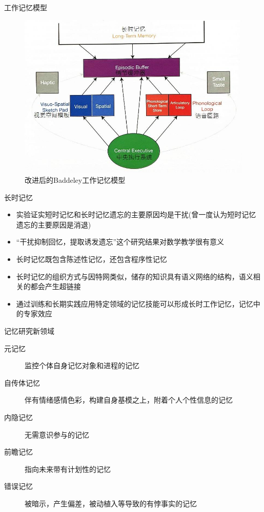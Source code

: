\documentclass[serif]{beamer}
\begin{document}
  \begin{frame}{工作记忆模型}
  \begin{figure}[t]
  	\centering
  	\includegraphics[scale=0.3]{model2.jpg}
  	\caption{改进后的Baddeley工作记忆模型}
  \end{figure}
  \end{frame}
  
  \begin{frame}{长时记忆}
       \begin{itemize}
       	 \item 实验证实短时记忆和长时记忆遗忘的主要原因均是干扰(曾一度认为短时记忆遗忘的主要原因是消退)
       	 \item “干扰抑制回忆，提取诱发遗忘”这个研究结果对数学教学很有意义
       	 \item 长时记忆既包含陈述性记忆，还包含程序性记忆
       	 \item 长时记忆的组织方式与因特网类似，储存的知识具有语义网络的结构，语义相关的都会产生超链接
       	 \item 通过训练和长期实践应用特定领域的记忆技能可以形成长时工作记忆，记忆中的专家效应
       \end{itemize}
  \end{frame}
  
  \begin{frame}{记忆研究新领域}
      \begin{description}
      	\item[元记忆] 监控个体自身记忆对象和进程的记忆
      	\item[自传体记忆] 伴有情绪感情色彩，构建自身基模之上，附着个人个性信息的记忆
      	\item[内隐记忆] 无需意识参与的记忆
      	\item[前瞻记忆] 指向未来带有计划性的记忆
      	\item[错误记忆] 被暗示，产生偏差，被动植入等导致的有悖事实的记忆
      \end{description}
  \end{frame}
  
\end{document}
